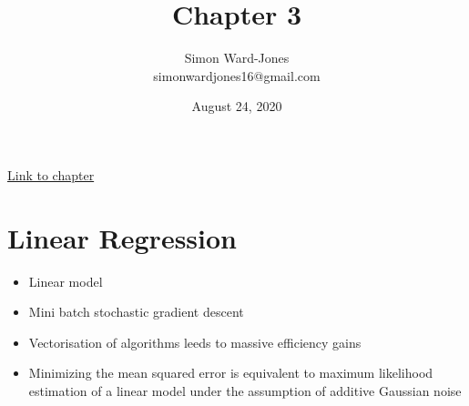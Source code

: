 \documentclass[12pt,notitlepage]{article}
\begin{document}


\title{\Large{\textbf{Chapter 3}}}
\date{August 24, 2020}
\author{Simon Ward-Jones\\simonwardjones16@gmail.com}

\maketitle
\href{https://d2l.ai/chapter_linear-networks/linear-regression.html}{Link to chapter}

\section{Linear Regression}
\begin{itemize}
    \item Linear model
    \item Mini batch stochastic gradient descent
    \item Vectorisation of algorithms leeds to massive efficiency gains
    \item Minimizing the mean squared error is equivalent to maximum likelihood estimation of a linear model under the assumption of additive Gaussian noise
\end{itemize}

\vfill

\nocite{zhang2020dive}
\end{document}
